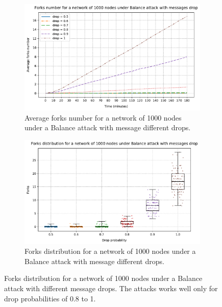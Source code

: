 \begin{figure}[h]
	\begin{subfigure}{\textwidth}
		\centering
		\includegraphics[width=\myplotswitdth \columnwidth]{plots/forks_attack_drop_linechart}
		\vspace*{0.25cm}
		\caption{Average forks number for a network of \num{1000} nodes under a Balance attack with message different drops.}
		\vspace*{0.75cm}
	\end{subfigure}
	\begin{subfigure}{\textwidth}
		\centering
		\vspace*{0.25cm}
		\includegraphics[width=\myplotswitdth \columnwidth]{plots/forks_attack_drop_boxplot}
		\vspace*{0.25cm}
		\caption{Forks distribution for a network of \num{1000} nodes under a Balance attack with message different drops.}
		\vspace*{0.25cm}
	\end{subfigure}
	\caption[Forks distribution for a network of \num{1000} nodes under a Balance attack with different message drops]{
		Forks distribution for a network of \num{1000} nodes under a Balance attack with different message drops.
		The attacks works well only for drop probabilities of \num{0.8} to \num{1}.
	}
	\label{fig:forks-attack-drop}
\end{figure}

